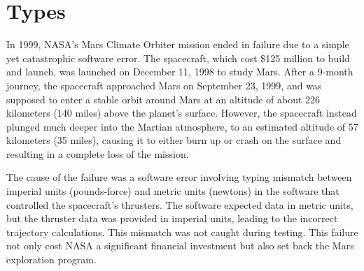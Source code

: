 \documentclass[oneside,11pt,dvipsnames]{book}
\newcommand{\code}[1]{\texttt{#1}}
\begin{document}




\chapter{Types}

In 1999, NASA's Mars Climate Orbiter mission ended in failure due to a simple yet catastrophic software error. The spacecraft, which cost \$125 million to build and launch, was launched on December 11, 1998 to study Mars. After a 9-month journey, the spacecraft approached Mars on September 23, 1999, and was supposed to enter a stable orbit around Mars at an altitude of about 226 kilometers (140 miles) above the planet’s surface. However, the spacecraft instead plunged much deeper into the Martian atmosphere, to an estimated altitude of 57 kilometers (35 miles), causing it to either burn up or crash on the surface and resulting in a complete loss of the mission.

The cause of the failure was a software error involving typing mismatch between imperial units (pounds-force) and metric units (newtons) in the software that controlled the spacecraft's thrusters. The software expected data in metric units, but the thruster data was provided in imperial units, leading to the incorrect trajectory calculations. This mismatch was not caught during testing. This failure not only cost NASA a significant financial investment but also set back the Mars exploration program. 
\end{document}
